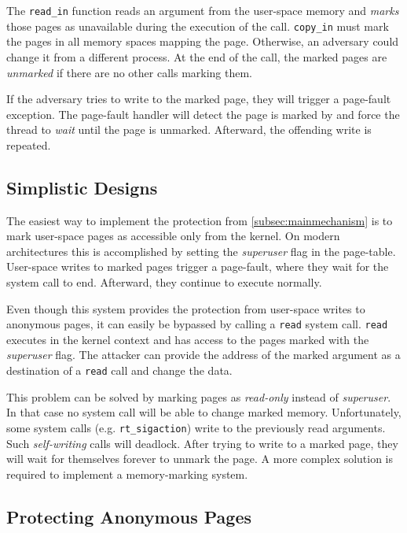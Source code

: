 The \texttt{read\_in} function reads an argument from the user-space memory and
\emph{marks} those pages as unavailable during the execution of the call.
\texttt{copy\_in} must mark the pages in all memory spaces mapping the page.
Otherwise, an adversary could change it from a different process. At the end of
the call, the marked pages are \emph{unmarked} if there are no other calls
marking them.

If the adversary tries to write to the marked page, they will trigger a page-fault
exception. The page-fault handler will detect the page is marked by \sysname and
force the thread to \emph{wait} until the page is unmarked. Afterward, the 
offending write is repeated. 


\subsection{Simplistic Designs}
\label{simplistic}
The easiest way to implement the protection from \autoref{subsec:mainmechanism}
is to mark user-space pages as accessible only from the kernel. On modern
architectures this is accomplished by setting the \emph{superuser} flag in the
page-table. User-space writes to marked pages trigger a page-fault, where they
wait for the system call to end. Afterward, they continue to execute normally.

Even though this system provides the protection from user-space
writes to anonymous pages, it can easily be bypassed by calling a \texttt{read}
system call. \texttt{read} executes in the kernel context and has access to 
the pages marked with the \emph{superuser} flag. The attacker can provide the
address of the marked argument as a destination of a \texttt{read} call and 
change the data.

This problem can be solved by marking pages as \emph{read-only} instead of
\emph{superuser}. In that case no system call will be able to change marked
memory. Unfortunately, some system calls (e.g. \texttt{rt\_sigaction}) write to
the previously read arguments. Such \emph{self-writing} calls will deadlock.
After trying to write to a marked page, they will wait for themselves forever to
unmark the page. A more complex solution is required to implement a
memory-marking system.


\subsection{Protecting Anonymous Pages}
\label{complex}

